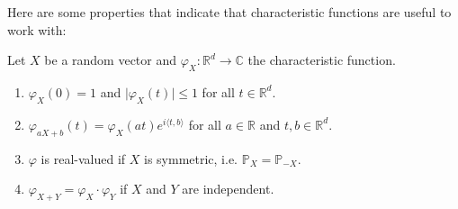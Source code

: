 Here are some properties that indicate that characteristic functions are useful to work with:
\begin{laussagewerkzeug}
\begin{lemma}\label{lemma_5111}
	Let $X$ be a random vector and $\varphi_X \colon \mathbb{R}^d \to \mathbb{C}$ the characteristic function.
	\begin{enumerate}[label=(\roman*)]
		\item $\varphi_X(0) = 1$ and $\lvert \varphi_X(t) \rvert \leq 1$ for all $t \in \mathbb{R}^d$.
		\item $\varphi_{aX+b}(t) = \varphi_X(a t)  e^{i\langle t,b \rangle}$ for all $ a \in \mathbb{R}$ and $t, b\in \mathbb{R}^d$.
		\item $\varphi$ is real-valued if $X$ is symmetric, i.e. $\mathbb{P}_X = \mathbb{P}_{-X}$.
		\item $\varphi_{X+Y} = \varphi_X \cdot \varphi_Y$ if $X$ and $Y$ are independent.
	\end{enumerate}
\end{lemma}
\end{laussagewerkzeug}
